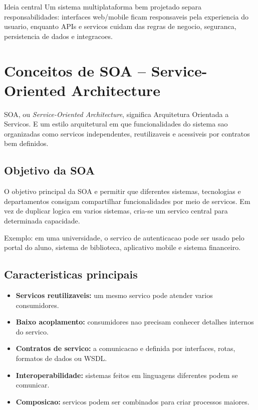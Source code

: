 \documentclass[12pt,a4paper]{article}
\begin{document}
\begin{conceito}{Ideia central}
Um sistema multiplataforma bem projetado separa responsabilidades: interfaces web/mobile ficam responsaveis pela experiencia do usuario, enquanto APIs e servicos cuidam das regras de negocio, seguranca, persistencia de dados e integracoes.
\end{conceito}

\section{Conceitos de SOA -- Service-Oriented Architecture}

SOA, ou \textit{Service-Oriented Architecture}, significa Arquitetura Orientada a Servicos. E um estilo arquitetural em que funcionalidades do sistema sao organizadas como servicos independentes, reutilizaveis e acessiveis por contratos bem definidos.

\subsection{Objetivo da SOA}

O objetivo principal da SOA e permitir que diferentes sistemas, tecnologias e departamentos consigam compartilhar funcionalidades por meio de servicos. Em vez de duplicar logica em varios sistemas, cria-se um servico central para determinada capacidade.

Exemplo: em uma universidade, o servico de autenticacao pode ser usado pelo portal do aluno, sistema de biblioteca, aplicativo mobile e sistema financeiro.

\subsection{Caracteristicas principais}

\begin{itemize}
  \item \textbf{Servicos reutilizaveis:} um mesmo servico pode atender varios consumidores.
  \item \textbf{Baixo acoplamento:} consumidores nao precisam conhecer detalhes internos do servico.
  \item \textbf{Contratos de servico:} a comunicacao e definida por interfaces, rotas, formatos de dados ou WSDL.
  \item \textbf{Interoperabilidade:} sistemas feitos em linguagens diferentes podem se comunicar.
  \item \textbf{Composicao:} servicos podem ser combinados para criar processos maiores.
\end{itemize}
\end{document}
